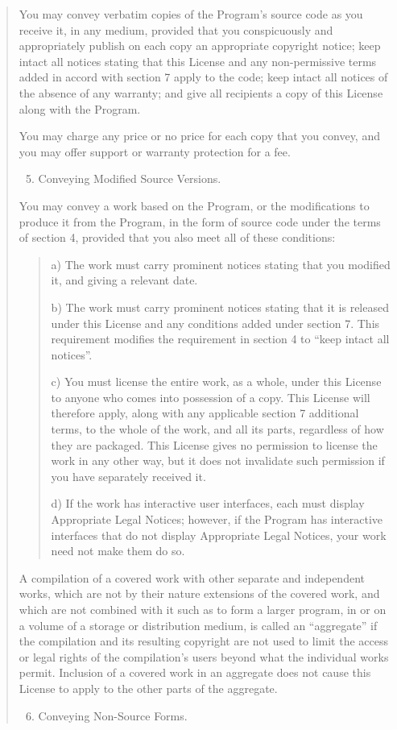 \documentclass[letterpaper,10pt,english]{sphinxmanual}
\begin{document}
\begin{quote}
\begin{enumerate}
\end{enumerate}

You may convey verbatim copies of the Program's source code as you
receive it, in any medium, provided that you conspicuously and
appropriately publish on each copy an appropriate copyright notice;
keep intact all notices stating that this License and any
non-permissive terms added in accord with section 7 apply to the code;
keep intact all notices of the absence of any warranty; and give all
recipients a copy of this License along with the Program.

You may charge any price or no price for each copy that you convey,
and you may offer support or warranty protection for a fee.
\begin{enumerate}
\setcounter{enumi}{4}
\item {} 
Conveying Modified Source Versions.

\end{enumerate}

You may convey a work based on the Program, or the modifications to
produce it from the Program, in the form of source code under the
terms of section 4, provided that you also meet all of these conditions:
\begin{quote}

a) The work must carry prominent notices stating that you modified
it, and giving a relevant date.

b) The work must carry prominent notices stating that it is
released under this License and any conditions added under section
7.  This requirement modifies the requirement in section 4 to
``keep intact all notices''.

c) You must license the entire work, as a whole, under this
License to anyone who comes into possession of a copy.  This
License will therefore apply, along with any applicable section 7
additional terms, to the whole of the work, and all its parts,
regardless of how they are packaged.  This License gives no
permission to license the work in any other way, but it does not
invalidate such permission if you have separately received it.

d) If the work has interactive user interfaces, each must display
Appropriate Legal Notices; however, if the Program has interactive
interfaces that do not display Appropriate Legal Notices, your
work need not make them do so.
\end{quote}

A compilation of a covered work with other separate and independent
works, which are not by their nature extensions of the covered work,
and which are not combined with it such as to form a larger program,
in or on a volume of a storage or distribution medium, is called an
``aggregate'' if the compilation and its resulting copyright are not
used to limit the access or legal rights of the compilation's users
beyond what the individual works permit.  Inclusion of a covered work
in an aggregate does not cause this License to apply to the other
parts of the aggregate.
\begin{enumerate}
\setcounter{enumi}{5}
\item {} 
Conveying Non-Source Forms.


\end{enumerate}
\end{quote}
\end{document}
